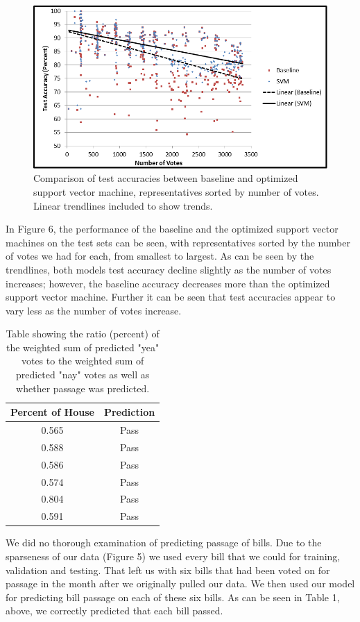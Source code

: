 \documentclass[11pt,letterpaper,twocolumn]{article}
\begin{document}
\begin{figure}[t]
\includegraphics[width=\linewidth]{size_accuracy2.png}
\caption{Comparison of test accuracies between baseline and optimized support vector machine, representatives sorted by number of votes. Linear trendlines included to show trends.}
\end{figure}

In Figure 6, the performance of the baseline and the optimized support vector machines on the test sets can be seen, with representatives sorted by the number of votes we had for each, from smallest to largest. As can be seen by the trendlines, both models test accuracy decline slightly as the number of votes increases; however, the baseline accuracy decreases more than the optimized support vector machine. Further it can be seen that test accuracies appear to vary less as the number of votes increase.

\begin{table}
\centering
\begin{tabular}{|c|c|} \hline
Percent of House & Prediction \\ \hline
0.565 & Pass \\ \hline
0.588 & Pass\\ \hline
0.586 & Pass\\ \hline
0.574 & Pass\\ \hline
0.804 & Pass\\ \hline
0.591 & Pass\\ \hline
\end{tabular}
\caption{Table showing the ratio (percent) of the weighted sum of predicted "yea" votes to the weighted sum of predicted "nay" votes as well as whether passage was predicted.}
\end{table}

We did no thorough examination of predicting passage of bills. Due to the sparseness of our data (Figure 5) we used every bill that we could for training, validation and testing. That left us with six bills that had been voted on for passage in the month after we originally pulled our data. We then used our model for predicting bill passage on each of these six bills. As can be seen in Table 1, above, we correctly predicted that each bill passed. 
\end{document}
